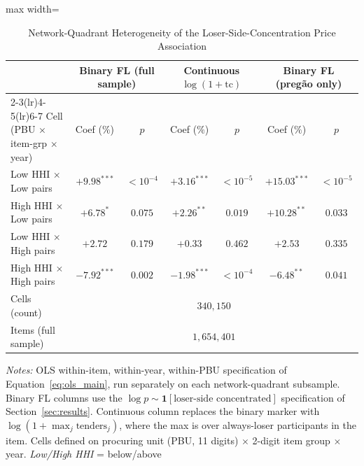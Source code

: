 \begin{table}[htbp]
\centering
\caption{Network-Quadrant Heterogeneity of the Loser-Side-Concentration Price Association}
\label{tab:unified_mechanism}
\begin{adjustbox}{max width=\textwidth}
\begin{threeparttable}
\small
\begin{tabular}{lcccccc}
\toprule
& \multicolumn{2}{c}{Binary FL (full sample)} & \multicolumn{2}{c}{Continuous $\log(1+\text{tc})$} & \multicolumn{2}{c}{Binary FL (preg\~ao only)} \\
\cmidrule(lr){2-3}\cmidrule(lr){4-5}\cmidrule(lr){6-7}
Cell (PBU $\times$ item-grp $\times$ year) & Coef ($\%$) & $p$ & Coef ($\%$) & $p$ & Coef ($\%$) & $p$ \\
\midrule
Low HHI $\times$ Low pairs        & $+9.98^{***}$  & $<\!10^{-4}$ & $+3.16^{***}$  & $<\!10^{-5}$ & $+15.03^{***}$ & $<\!10^{-5}$ \\
High HHI $\times$ Low pairs       & $+6.78^{*}$    & $0.075$      & $+2.26^{**}$   & $0.019$      & $+10.28^{**}$  & $0.033$ \\
Low HHI $\times$ High pairs       & $+2.72$        & $0.179$      & $+0.33$        & $0.462$      & $+2.53$        & $0.335$ \\
High HHI $\times$ High pairs      & $-7.92^{***}$  & $0.002$      & $-1.98^{***}$  & $<\!10^{-4}$ & $-6.48^{**}$   & $0.041$ \\
\midrule
Cells (count)                     & \multicolumn{6}{c}{$340{,}150$} \\
Items (full sample)               & \multicolumn{6}{c}{$1{,}654{,}401$} \\
\bottomrule
\end{tabular}
\begin{tablenotes}
\small
\item \textit{Notes:} OLS within-item, within-year, within-PBU
specification of Equation~\eqref{eq:ols_main}, run separately
on each network-quadrant subsample. Binary FL columns use the
$\log p \sim \mathbf{1}[\text{loser-side concentrated}]$ specification of
Section~\ref{sec:results}. Continuous column replaces the
binary marker with $\log(1 + \max_{j} \text{tenders}_j)$,
where the max is over always-loser participants in the item.
Cells defined on procuring unit (PBU, 11 digits) $\times$
2-digit item group $\times$ year. \emph{Low/High HHI} = below/above

\end{tablenotes}
\end{threeparttable}
\end{adjustbox}
\end{table}
